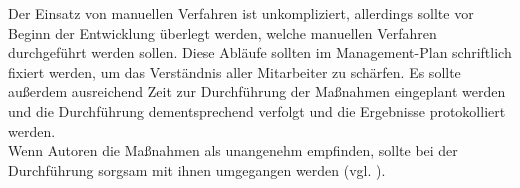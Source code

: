 \noindent
Der Einsatz von manuellen Verfahren ist unkompliziert, allerdings sollte vor Beginn der Entwicklung überlegt werden, welche manuellen Verfahren durchgeführt werden sollen.
Diese Abläufe sollten im Management-Plan schriftlich fixiert werden, um das Verständnis aller Mitarbeiter zu schärfen.
Es sollte außerdem ausreichend Zeit zur Durchführung der Maßnahmen eingeplant werden und die Durchführung dementsprechend verfolgt und die Ergebnisse protokolliert werden.\\
Wenn Autoren die Maßnahmen als unangenehm empfinden, sollte bei der Durchführung sorgsam mit ihnen umgegangen werden (vgl. \cite[17]{Wed09c}).
